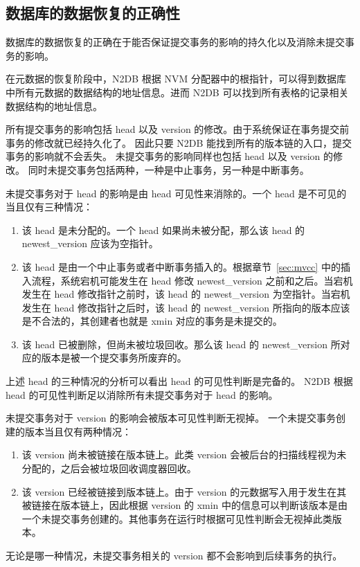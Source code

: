 \subsection{数据库的数据恢复的正确性}

数据库的数据恢复的正确在于能否保证提交事务的影响的持久化以及消除未提交事务的影响。

在元数据的恢复阶段中，N2DB 根据 NVM 分配器中的根指针，可以得到数据库中所有元数据的数据结构的地址信息。进而 N2DB 可以找到所有表格的记录相关数据结构的地址信息。

所有提交事务的影响包括 head 以及 version 的修改。由于系统保证在事务提交前事务的修改就已经持久化了。
因此只要 N2DB 能找到所有的版本链的入口，提交事务的影响就不会丢失。
未提交事务的影响同样也包括 head 以及 version 的修改。
同时未提交事务包括两种，一种是中止事务，另一种是中断事务。

未提交事务对于 head 的影响是由 head 可见性来消除的。一个 head 是不可见的当且仅有三种情况：
\begin{enumerate}
    \item 该 head 是未分配的。一个 head 如果尚未被分配，那么该 head 的 newest\_version 应该为空指针。
    \item 该 head 是由一个中止事务或者中断事务插入的。根据章节~\ref{sec:mvcc} 中的插入流程，系统宕机可能发生在 head 修改 newest\_version 之前和之后。当宕机发生在 head 修改指针之前时，该 head 的 newest\_version 为空指针。当宕机发生在 head 修改指针之后时，该 head 的 newest\_version 所指向的版本应该是不合法的，其创建者也就是 xmin 对应的事务是未提交的。
    \item 该 head 已被删除，但尚未被垃圾回收。那么该 head 的 newest\_version 所对应的版本是被一个提交事务所废弃的。
\end{enumerate}
上述 head 的三种情况的分析可以看出 head 的可见性判断是完备的。
N2DB 根据 head 的可见性判断足以消除所有未提交事务对于 head 的影响。

未提交事务对于 version 的影响会被版本可见性判断无视掉。
一个未提交事务创建的版本当且仅有两种情况：
\begin{enumerate}
    \item 该 version 尚未被链接在版本链上。此类 version 会被后台的扫描线程视为未分配的，之后会被垃圾回收调度器回收。
    \item 该 version 已经被链接到版本链上。由于 version 的元数据写入用于发生在其被链接在版本链上，因此根据 version 的 xmin 中的信息可以判断该版本是由一个未提交事务创建的。其他事务在运行时根据可见性判断会无视掉此类版本。
\end{enumerate}
无论是哪一种情况，未提交事务相关的 version 都不会影响到后续事务的执行。

